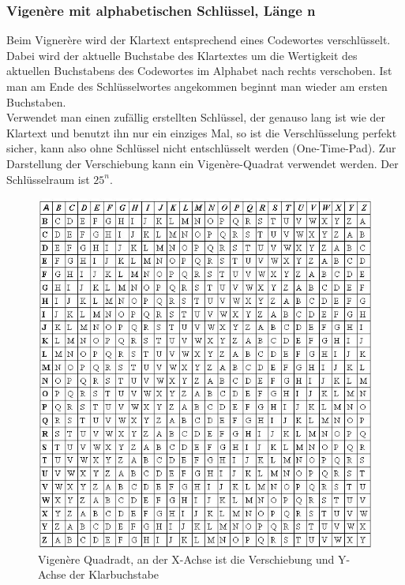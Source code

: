 \documentclass[a4paper,12pt,leqno]{article}
\begin{document}
\subsubsection{Vigenère mit alphabetischen Schlüssel, Länge n}
Beim Vignerère wird der Klartext entsprechend eines Codewortes verschlüsselt. Dabei wird der aktuelle Buchstabe des Klartextes um die Wertigkeit des aktuellen Buchstabens des Codewortes im Alphabet nach rechts verschoben. Ist man am Ende des Schlüsselwortes angekommen beginnt man wieder am ersten Buchstaben.\\
Verwendet man einen zufällig erstellten Schlüssel, der genauso lang ist wie der Klartext und benutzt ihn nur ein einziges Mal, so ist die Verschlüsselung perfekt sicher, kann also ohne Schlüssel nicht entschlüsselt werden (One-Time-Pad).
Zur Darstellung der Verschiebung kann ein Vigenère-Quadrat verwendet werden. Der Schlüsselraum ist $25^n$.\\
\begin{figure}[h!]
\centering
\includegraphics[scale=0.7]{Grafiken/VigenereSquare.jpg}
\caption{Vigenère Quadradt, an der X-Achse ist die Verschiebung und Y-Achse der Klarbuchstabe}
\end{figure}
\end{document}

